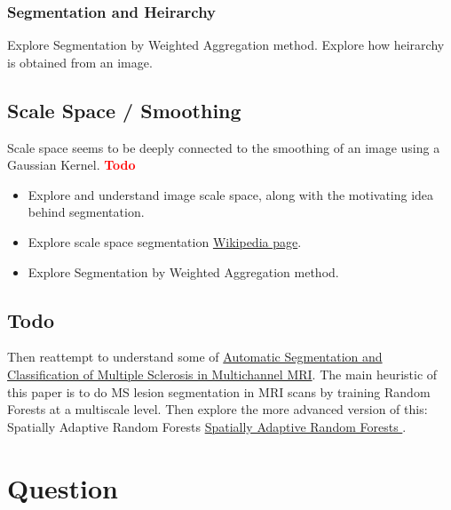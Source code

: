 \documentclass{report}
\begin{document}
\subsection{Segmentation and Heirarchy}
Explore Segmentation by Weighted Aggregation method. Explore how heirarchy is obtained from an image.
\section{Scale Space / Smoothing}
Scale space seems to be deeply connected to the smoothing of an image using a Gaussian Kernel. 
\textbf{\textcolor{red}{Todo}}
\begin{itemize}
\item Explore and understand image scale space, along with the motivating idea behind segmentation. 
\item Explore scale space segmentation \href{https://en.wikipedia.org/wiki/Scale-space_segmentation}{Wikipedia page}.
\item Explore Segmentation by Weighted Aggregation method.
\end{itemize}

\section{Todo}
Then reattempt to understand some of \href{https://ieeexplore.ieee.org/stamp/stamp.jsp?tp=&arnumber=5238795}{Automatic Segmentation and Classification
of Multiple Sclerosis in Multichannel MRI}. The main heuristic of this paper is to do MS lesion segmentation in MRI scans by training Random Forests at a multiscale level. Then explore the more advanced version of this: Spatially Adaptive Random Forests \href{https://ieeexplore.ieee.org/document/6556781}{Spatially Adaptive Random Forests
}.

\chapter{Question}

\end{document}

